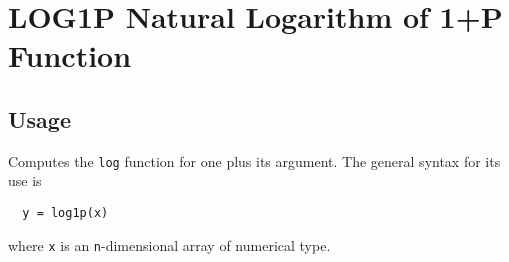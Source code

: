 \section{LOG1P Natural Logarithm of 1+P Function}

\subsection{Usage}

Computes the \verb|log| function for one plus its argument.  The general
syntax for its use is
\begin{verbatim}
  y = log1p(x)
\end{verbatim}
where \verb|x| is an \verb|n|-dimensional array of numerical type.
